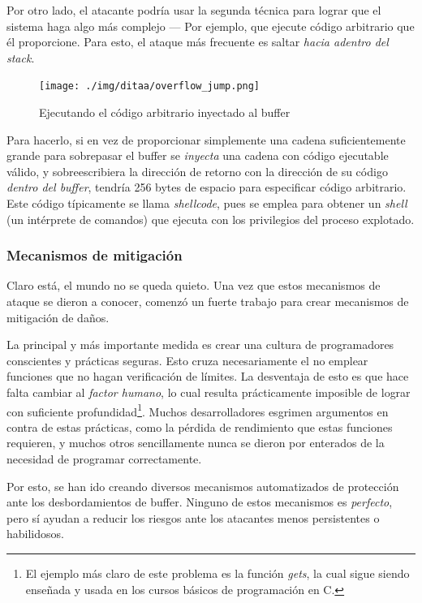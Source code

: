 \documentclass[11pt,fleqn]{book} %
\begin{document}
Por otro lado, el atacante podría usar la segunda técnica
para lograr que el sistema haga algo más complejo — Por ejemplo, que ejecute 
código arbitrario que él proporcione. Para esto, el ataque más frecuente 
es saltar \emph{hacia adentro del stack}.

\begin{figure}[htb]
\centering
\texttt{[image: ./img/ditaa/overflow\_jump.png]}
\caption{\label{MEM_overflow_jump}Ejecutando el código arbitrario inyectado al buffer}
\end{figure}

Para hacerlo, si en vez de proporcionar simplemente una cadena
suficientemente grande para sobrepasar el buffer se \emph{inyecta} una
cadena con código ejecutable válido, y sobreescribiera la dirección de
retorno con la dirección de su código \emph{dentro del buffer}, tendría
256 bytes de espacio para especificar código arbitrario. Este código
típicamente se llama \emph{shellcode}, pues se emplea para obtener un
\emph{shell} (un intérprete de comandos) que ejecuta con los privilegios
del proceso explotado.
\subsubsection{Mecanismos de mitigación}
\label{sec-5-6-1-4}


Claro está, el mundo no se queda quieto. Una vez que estos mecanismos
de ataque se dieron a conocer, comenzó un fuerte trabajo para crear
mecanismos de mitigación de daños.

La principal y más importante medida es crear una cultura de
programadores conscientes y prácticas seguras. Esto cruza
necesariamente el no emplear funciones que no hagan verificación de
límites. La desventaja de esto es que hace falta cambiar al \emph{factor humano}, lo cual resulta prácticamente imposible de lograr con
suficiente profundidad\footnote{El ejemplo más claro de este problema es la función
\emph{gets}, la cual sigue siendo enseñada y usada en los cursos básicos de
programación en C. }. Muchos desarrolladores esgrimen argumentos en
contra de estas prácticas, como la pérdida de rendimiento que estas
funciones requieren, y muchos otros sencillamente nunca se dieron por
enterados de la necesidad de programar correctamente.

Por esto, se han ido creando diversos mecanismos automatizados de
protección ante los desbordamientos de buffer. Ninguno de estos
mecanismos es \emph{perfecto}, pero sí ayudan a reducir los riesgos ante
los atacantes menos persistentes o habilidosos.
\end{document}
